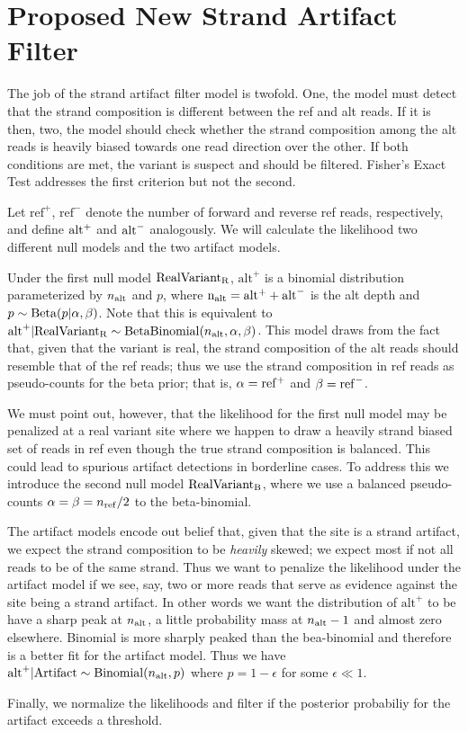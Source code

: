 \documentclass[11pt]{article}
\begin{document}

\section{Proposed New Strand Artifact Filter}

\bigbreak \noindent
The job of the strand artifact filter model is twofold. One, the model must detect that the strand composition is different between the ref and alt reads. If it is then, two, the model should check whether the strand composition among the alt reads is heavily biased towards one read direction over the other. If both conditions are met, the variant is suspect and should be filtered. Fisher's Exact Test addresses the first criterion but not the second. 

\bigbreak \noindent 
Let $\mathrm{ref}^+$, $\mathrm{ref}^-$ denote the number of forward and reverse ref reads, respectively, and define ${\rm alt^+}$ and ${\rm alt}^-$ analogously. We will calculate the likelihood two different null models and the two artifact models.

\bigbreak \noindent 
Under the first null model ${\rm Real Variant_R}$, $\mathrm{alt}^+$ is a binomial distribution parameterized by $n_{\rm alt}$ and $p$, where ${\rm n_{\rm alt}} = {\rm alt^+} + {\rm alt}^-$ is the alt depth and $p \sim {\rm Beta}(p|\alpha, \beta)$.  Note that this is equivalent to $\mathrm{alt}^+ | {\rm Real Variant_R} \sim {\rm BetaBinomial}(n_{\rm alt}, \alpha, \beta)$. This model draws from the fact that, given that the variant is real, the strand composition of the alt reads should resemble that of the ref reads; thus we use the strand composition in ref reads as pseudo-counts for the beta prior; that is, $\alpha = {\rm ref^+}$ and $\beta = {\rm ref}^-$. 

\bigbreak \noindent 
We must point out, however, that the likelihood for the first null model may be penalized at a real variant site where we happen to draw a heavily strand biased set of reads in ref even though the true strand composition is balanced. This could lead to spurious artifact detections in borderline cases. To address this we introduce the second null model ${\rm Real Variant_B}$, where we use a balanced pseudo-counts $\alpha = \beta = n_{\rm ref}/2$ to the beta-binomial.

\bigbreak \noindent
The artifact models encode out belief that, given that the site is a strand artifact, we expect the strand composition to be \emph{heavily} skewed; we expect most if not all reads to be of the same strand.
Thus we want to penalize the likelihood under the artifact model if we see, say, two or more reads that serve as evidence against the site being a strand artifact. In other words we want the distribution of $\mathrm{alt}^+$ to be have a sharp peak at $n_{\rm alt}$, a little probability mass at $n_{\rm alt} - 1$ and almost zero elsewhere.  Binomial is more sharply peaked than the bea-binomial and therefore is a better fit for the artifact model.  Thus we have $\mathrm{alt}^+ | {\rm Artifact} \sim {\rm Binomial}(n_{\rm alt}, p)$ where $p = 1 - \epsilon$ for some $\epsilon \ll 1$.

\bigbreak \noindent
Finally, we normalize the likelihoods and filter if the posterior probabiliy for the artifact exceeds a threshold.
\end{document}
